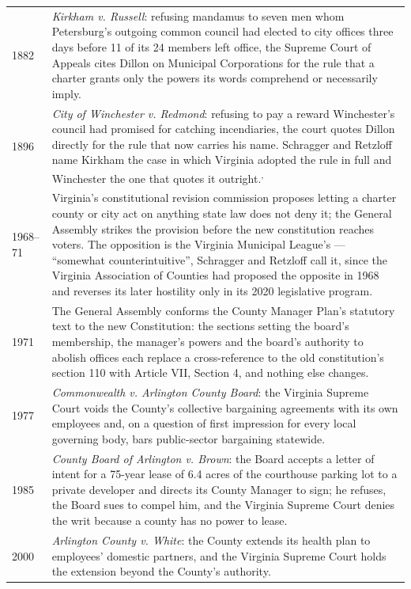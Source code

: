 \documentclass[11pt]{article}
\makeatletter
\newcommand{\timeline}[1]{%
  \begin{center}
  \begin{tabular}{@{}p{0.17\textwidth}p{0.77\textwidth}@{}}
    \toprule
    #1
    \bottomrule
  \end{tabular}
  \end{center}}
\newcommand{\fnsep}{\textsuperscript{,}}
\makeatother
\begin{document}
\timeline{
  1882 & \textit{Kirkham v. Russell}: refusing mandamus to seven men whom
  Petersburg's outgoing common council had elected to city offices three days
  before 11 of its 24 members left office, the Supreme Court of
  Appeals cites Dillon on Municipal Corporations for the rule that a charter
  grants only the powers its words comprehend or necessarily
  imply.\autocite{kirkhamvrussell1882} \\[2pt]
  1896 & \textit{City of Winchester v. Redmond}: refusing to pay a reward
  Winchester's council had promised for catching incendiaries, the court
  quotes Dillon directly for the rule that now carries his name. Schragger and
  Retzloff name Kirkham the case in which Virginia adopted the rule in full and
  Winchester the one that quotes it
  outright.\autocite{winchestervredmond1896}\fnsep\autocite[195--96]{schragger2022}
  \\[2pt]
  1968--71 & Virginia's constitutional revision commission proposes letting a
  charter county or city act on anything state law does not deny it; the
  General Assembly strikes the provision before the new constitution reaches
  voters. The opposition is the Virginia Municipal League's --- ``somewhat
  counterintuitive'', Schragger and Retzloff call it, since the Virginia
  Association of Counties had proposed the opposite in 1968 and reverses its
  later hostility only in its 2020 legislative
  program.\autocite[200]{schragger2022} \\[2pt]
  1971 & The General Assembly conforms the County Manager Plan's statutory
  text to the new Constitution: the sections setting the board's membership,
  the manager's powers and the board's authority to abolish offices each
  replace a cross-reference to the old constitution's section 110 with Article
  VII, Section 4, and nothing else changes.\autocite{vaacts1971exsess} \\[2pt]
  1977 & \textit{Commonwealth v. Arlington County Board}: the Virginia Supreme
  Court voids the County's collective bargaining agreements with its own
  employees and, on a question of first impression for every local governing
  body, bars public-sector bargaining statewide.\autocite{commonwealthvarlington1977}
  \\[2pt]
  1985 & \textit{County Board of Arlington v. Brown}: the Board accepts a letter
  of intent for a 75-year lease of 6.4 acres of the courthouse
  parking lot to a private developer and directs its County Manager to sign;
  he refuses, the Board sues to compel him, and the Virginia Supreme Court
  denies the writ because a county has no power to
  lease.\autocite{brownvarlington1985} \\[2pt]
  2000 & \textit{Arlington County v. White}: the County extends its health plan
  to employees' domestic partners, and the Virginia Supreme Court holds the
  extension beyond the County's authority.\autocite{arlingtonvwhite2000} \\
}

\clearpage
{}
\printauthorities
\end{document}
